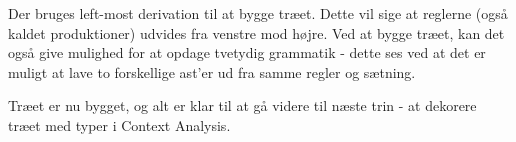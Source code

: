 
\noindent Der bruges left-most derivation til at bygge træet. Dette vil sige at reglerne (også kaldet produktioner) udvides fra venstre mod højre. Ved at bygge træet, kan det også give mulighed for at opdage tvetydig grammatik - dette ses ved at det er muligt at lave to forskellige \gls{ast}'er ud fra samme regler og sætning.


\noindent Træet er nu bygget, og alt er klar til at gå videre til næste trin - at dekorere træet med typer i Context Analysis.